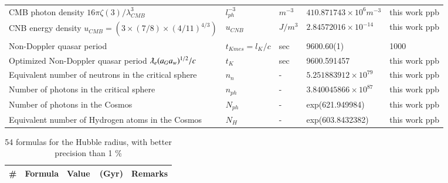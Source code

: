 \documentclass[a4paper,9pt]{article}
\begin{document}
\begin{appendix}
\begin{table}
\begin{tabular}{lllll}
 CMB photon density $16 \pi \zeta (3)/\lambda_{CMB}^3$  & $l_{ph}^{-3}$  & $m^{-3}$   & $410.871743 \times 10^6 m^{-3}$ & this work ppb\\
 
  CNB energy density $u_{CMB} = (3\times (7/8) \times (4/11)^{4/3})$ & $u_{CNB}$ & $J/m^3$ & $2.84572016\times 10^{-14}$ & this work ppb\\
  
  Non-Doppler quasar period & $t_{Kmes} = l_K/c$ & sec & 9600.60(1) & 1000 \\
  
 Optimized Non-Doppler quasar period $\lambdabar_e (a_Ga_w)^{1/2}/c$ & $t_{K}$ & sec & 9600.591457 & this work ppb \\
 
 Equivalent number of neutrons in the critical sphere & $n_n$ & - & $5.251883912 \times 10^{79}$ & this work ppb \\
 
 Number of photons in the critical sphere  & $n_{ph}$ & - & $3.840045866 \times 10^{87}$ & this work ppb \\
 
 Number of photons in the Cosmos  & $N_{ph}$ & - & exp(621.949984) & this work ppb \\
 
 Equivalent number of Hydrogen atoms in the Cosmos  & $N_H$ & - & exp(603.8432382) & this work ppb \\
 \bottomrule
  \end{tabular}
\end{table}
 

\begin{table}
\caption{54 formulas for the Hubble radius, with better precision than 1 \%}
\label{tab:4:table4}
  \hskip-2.0cm\begin{tabular}{llll}
    \toprule
    \cmidrule(r){1-4}
   \#     & Formula     & Value~~(Gyr) & Remarks \\
    \midrule
    

\end{tabular}
\end{table}
\end{appendix}
\end{document}
